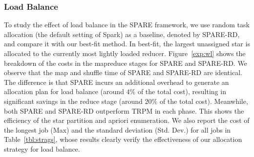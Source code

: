 \subsubsection{Load Balance}
To study the effect of load balance in the SPARE framework, we use random task allocation (the default setting of Spark) as a baseline, denoted by SPARE-RD, and compare it with our best-fit method. In best-fit, the largest unassigned star is allocated to the currently most lightly loaded reducer.
Figure~\ref{exp:wl} shows the breakdown of the costs in the mapreduce stages 
for SPARE and SPARE-RD. %
We observe that the map and shuffle time of SPARE and SPARE-RD are identical. The difference is that SPARE incurs an additional overhead to generate an allocation plan for load balance (around $4\%$ of the total cost), resulting in significant savings in the reduce stage (around $20\%$ of the total cost). 
Meanwhile, both SPARE and SPARE-RD outperform TRPM in each phase. This shows the 
efficiency of the star partition and apriori enumeration.
We also report the cost of the longest job (Max) and the standard deviation (Std. Dev.)
for all jobs in Table~\ref{tbl:strags}, whose results clearly verify the effectiveness of our allocation strategy for load balance.
%

%

